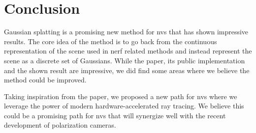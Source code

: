 \section{Conclusion}
Gaussian splatting is a promising new method for \gls{nvs} that has shown impressive results.
The core idea of the method is to go back from the continuous representation of the scene used in \gls{nerf} related methods and instead represent the scene as a discrete set of Gaussians.
While the paper, its public implementation and the shown result are impressive, we did find some areas where we believe the method could be improved.

Taking inspiration from the paper, we proposed a new path for \gls{nvs} where we leverage the power of modern hardware-accelerated ray tracing.
We believe this could be a promising path for \gls{nvs} that will synergize well with the recent development of polarization cameras.